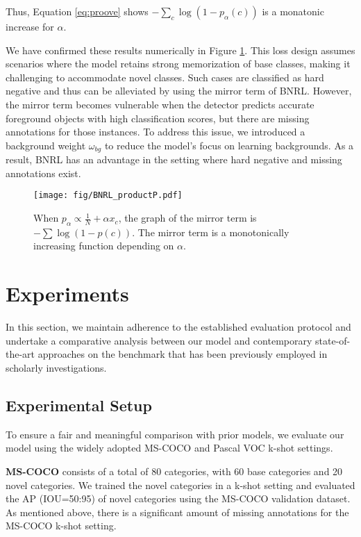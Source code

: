 \documentclass{article}
\begin{document}
Thus, Equation \ref{eq:proove} shows $- \sum_c \log \left( 1- p_\alpha(c) \right)$ is a monatonic increase for $\alpha$.

We have confirmed these results numerically in Figure \ref{fig:numerical}. This loss design assumes scenarios where the model retains strong memorization of base classes, making it challenging to accommodate novel classes. 
Such cases are classified as hard negative and thus can be alleviated by using the mirror term of BNRL.
However, the mirror term becomes vulnerable when the detector predicts accurate foreground objects with high classification scores, but there are missing annotations for those instances. To address this issue, we introduced a background weight $\omega_{bg}$ to reduce the model's focus on learning backgrounds. 
As a result, BNRL has an advantage in the setting where hard negative and missing annotations exist.

\begin{figure}[h]
    \centering
    \texttt{[image: fig/BNRL\_productP.pdf]}
\caption{When $p_\alpha \propto \frac{1}{N} + \alpha x_{c}$, the graph of the mirror term is $- \sum \log(1-p(c))$. The mirror term is a monotonically increasing function depending on $\alpha$. 
}
\label{fig:numerical}
\end{figure}

\medskip

\section{Experiments}
In this section, we maintain adherence to the established evaluation protocol \cite{tfa} and undertake a comparative analysis between our model and contemporary state-of-the-art approaches on the benchmark that has been previously employed in scholarly investigations.

\subsection{Experimental Setup}
To ensure a fair and meaningful comparison with prior models, we evaluate our model using the widely adopted MS-COCO \cite{coco} and Pascal VOC \cite{voc} k-shot settings.

{\bf MS-COCO} consists of a total of 80 categories, with 60 base categories and 20 novel categories. We trained the novel categories in a k-shot setting and evaluated the AP (IOU=50:95) of novel categories using the MS-COCO validation dataset. 
As mentioned above, there is a significant amount of missing annotations for the MS-COCO k-shot setting.
\end{document}
